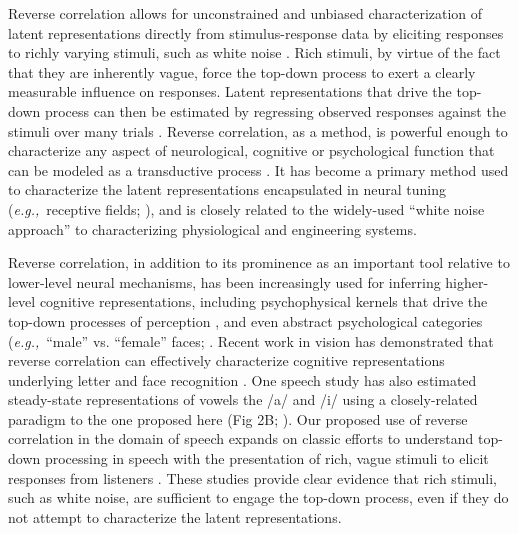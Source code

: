 \documentclass[11pt, notitlepage]{article} %
\def\eg{{\emph{e.g.,}}~}
\begin{document}
Reverse correlation allows for unconstrained and unbiased
characterization of latent representations directly from stimulus-response data by eliciting responses to
richly varying stimuli, such as white noise \cite{marmarelisWhiteNoiseMethodSystem1978, nishimotoReceptiveFieldProperties2006}.
Rich stimuli, by virtue of the fact that they are inherently vague, force the top-down process to exert a clearly
measurable influence on responses. Latent representations that drive the top-down process can then be
estimated by regressing observed responses against the stimuli over many trials \cite{mineaultImprovedClassificationImages2009}.
Reverse correlation, as a method, is powerful enough to characterize any aspect of neurological,
cognitive or psychological function that can be modeled as a transductive process \cite{ringachReverseCorrelationNeurophysiology2004}.
It has become a primary method used to characterize the latent representations encapsulated in neural tuning
(\eg receptive fields; \cite{ringachReverseCorrelationNeurophysiology2004}), and is closely related to the widely-used ``white noise approach'' to
characterizing physiological \cite{marmarelisWhiteNoiseMethodSystem1978} and engineering \cite{ljungMeasureLackFit1978} systems. 

Reverse correlation, in addition to its prominence as an important tool relative to lower-level
neural mechanisms, has been increasingly used for inferring higher-level cognitive representations,
including psychophysical kernels that drive the top-down processes of perception
\cite{ahumadaStimulusFeaturesSignal1971, neriReceptivePerceptiveFields2006,gosselinSuperstitiousPerceptionsReveal2003,smithMeasuringInternalRepresentations2012}, 
and even abstract psychological
categories (\eg ``male'' vs. ``female'' faces; \cite{brinkmanVisualisingMentalRepresentations2017,manginiMakingIneffableExplicit2004,ponsotCrackingSocialCode2018}.
Recent work in vision has demonstrated that
reverse correlation can effectively characterize cognitive representations underlying letter and face
recognition \cite{gosselinSuperstitiousPerceptionsReveal2003,liuSeeingJesusToast2014}.
One speech study has also estimated steady-state representations of vowels the /a/
and /i/ using a closely-related paradigm to the one proposed here (Fig 2B; \cite{brimijoinInternalRepresentationVowel2013}). Our
proposed use of reverse correlation in the domain of speech expands on classic efforts to understand
top-down processing in speech with the presentation of rich, vague stimuli to elicit responses from
listeners \cite{warrenAuditoryIllusionsConfusions1970,vokeySubliminalMessagesDevil1985}.
These studies provide clear evidence that rich
stimuli, such as white noise, are sufficient to engage the top-down process, even if they do not attempt to
characterize the latent representations.
\end{document}
